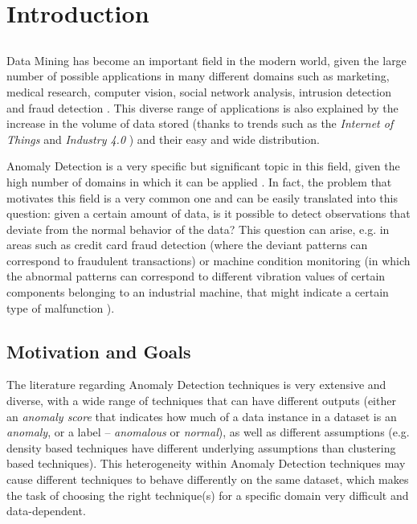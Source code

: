 \chapter{Introduction} \label{chap:intro}

\section*{}

Data Mining has become an important field in the modern world, given the large number of possible applications in many different domains such as marketing, medical research, computer vision, social network analysis, intrusion detection and fraud detection \cite{Aggarwal:2015:DMT:2778285}.
This diverse range of applications is also explained by the increase in the volume of data stored (thanks to trends such as the \textit{Internet of Things} \cite{atzori2010internet} and \textit{Industry 4.0} \cite{lasi2014industry}) and their easy and wide distribution.

Anomaly Detection is a very specific but significant topic in this field, given the high number of domains in which it can be applied \cite{Kandhari2009}. In fact, the problem that motivates this field is a very common one and can be easily translated into this question: given a certain amount of data, is it possible to detect observations that deviate from the normal behavior of the data?
This question can arise, e.g. in areas such as credit card fraud detection (where the deviant patterns can correspond to fraudulent transactions) or machine condition monitoring (in which the abnormal patterns can correspond to different vibration values of certain components belonging to an industrial machine, that might indicate a certain type of malfunction \cite{Langone2015}).

\section{Motivation and Goals} \label{sec:goals} 

The literature regarding Anomaly Detection techniques is very extensive and diverse, with a wide range of techniques that can have different outputs (either an \textit{anomaly score} that indicates how much of a data instance in a dataset is an \textit{anomaly}, or a label -- \textit{anomalous} or \textit{normal}), as well as different assumptions (e.g. density based techniques have different underlying assumptions than clustering based techniques).
This heterogeneity within Anomaly Detection techniques may cause different techniques to behave differently on the same dataset, which makes the task of choosing the right technique(s) for a specific domain very difficult and data-dependent.

